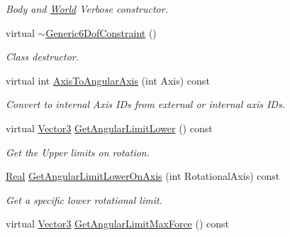\begin{DoxyCompactItemize}
\begin{DoxyCompactList}\small\item\em Body and \hyperlink{classMezzanine_1_1World}{World} Verbose constructor. \item\end{DoxyCompactList}\item 
\hypertarget{classMezzanine_1_1Generic6DofConstraint_a13e111a96aa15ccd2107c8910236471b}{
virtual \hyperlink{classMezzanine_1_1Generic6DofConstraint_a13e111a96aa15ccd2107c8910236471b}{$\sim$Generic6DofConstraint} ()}
\label{classMezzanine_1_1Generic6DofConstraint_a13e111a96aa15ccd2107c8910236471b}

\begin{DoxyCompactList}\small\item\em Class destructor. \item\end{DoxyCompactList}\item 
virtual int \hyperlink{classMezzanine_1_1Generic6DofConstraint_ad782a17567bfcfb2a0eaf08edb5d6838}{AxisToAngularAxis} (int Axis) const 
\begin{DoxyCompactList}\small\item\em Convert to internal Axis IDs from external or internal axis IDs. \item\end{DoxyCompactList}\item 
virtual \hyperlink{classMezzanine_1_1Vector3}{Vector3} \hyperlink{classMezzanine_1_1Generic6DofConstraint_a1a9a5c30e5d2a39ceb99232ad375d9ab}{GetAngularLimitLower} () const 
\begin{DoxyCompactList}\small\item\em Get the Upper limits on rotation. \item\end{DoxyCompactList}\item 
\hyperlink{namespaceMezzanine_a726731b1a7df72bf3583e4a97282c6f6}{Real} \hyperlink{classMezzanine_1_1Generic6DofConstraint_a5c69e50d1fe27ac8bb99a60d665cee48}{GetAngularLimitLowerOnAxis} (int RotationalAxis) const 
\begin{DoxyCompactList}\small\item\em Get a specific lower rotational limit. \item\end{DoxyCompactList}\item 
virtual \hyperlink{classMezzanine_1_1Vector3}{Vector3} \hyperlink{classMezzanine_1_1Generic6DofConstraint_ae0734d106fddaea99c36a27cdcddab3c}{GetAngularLimitMaxForce} () const 

\end{DoxyCompactItemize}
